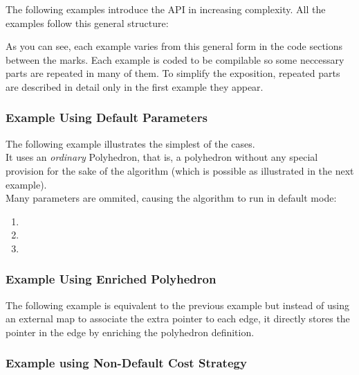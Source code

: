 The following examples introduce the API in increasing complexity. All the examples follow this general structure:


As you can see, each example varies from this general form in the code sections between the marks.
Each example is coded to be compilable so some neccessary parts are repeated in many of them. To simplify the exposition, repeated parts are described in detail only in the first example they appear.

\subsubsection{Example Using Default Parameters}

The following example illustrates the simplest of the cases.\\
It uses an {\em ordinary} Polyhedron, that is, a polyhedron without any special provision 
for the sake of the algorithm (which is possible as illustrated in the next example).\\
Many parameters are ommited, causing the algorithm to run in default mode:

\begin{enumerate}
\item {}
\item {}
\item {}
\end{enumerate}


\subsubsection{Example Using Enriched Polyhedron}

The following example is equivalent to the previous example but instead of using an external map to associate the extra pointer to each edge, it directly stores the pointer in the edge by enriching the polyhedron definition.


\subsubsection{Example using Non-Default Cost Strategy}

